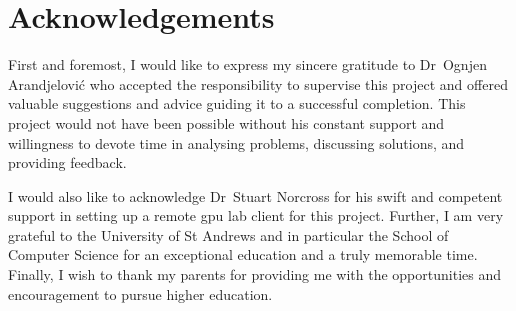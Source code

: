 \documentclass[../report.tex]{subfiles}
\begin{document}
\chapter*{Acknowledgements}

First and foremost, I would like to express my sincere gratitude to Dr~Ognjen Arandjelović who accepted the responsibility to supervise this project and offered valuable suggestions and advice guiding it to a successful completion. 
This project would not have been possible without his constant support and willingness to devote time in analysing problems, discussing solutions, and providing feedback. 

I would also like to acknowledge Dr~Stuart Norcross for his swift and competent support in setting up a remote \acs{gpu} lab client for this project. 
Further, I am very grateful to the University of St Andrews and in particular the School of Computer Science for an exceptional education and a truly memorable time. 
Finally, I wish to thank my parents for providing me with the opportunities and encouragement to pursue higher education.
\end{document}
